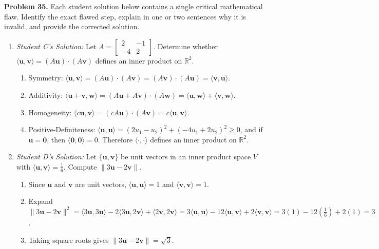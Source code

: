 \documentclass[11pt, letterpaper]{article}
\theoremstyle{definition}
\theoremstyle{remark}
\begin{document}
\textbf{Problem 35.} Each student solution below contains a single critical mathematical flaw. Identify the exact flawed step, explain in one or two sentences why it is invalid, and provide the corrected solution.
\begin{enumerate}[label=(\alph*)]
    \item \emph{Student C's Solution:} Let $A = \begin{bmatrix} 2 & -1 \\ -4 & 2 \end{bmatrix}$. Determine whether $\langle \mathbf{u}, \mathbf{v} \rangle = (A\mathbf{u}) \cdot (A\mathbf{v})$ defines an inner product on $\mathbb{R}^2$.
    \begin{enumerate}[label=Step \arabic*:]
        \item Symmetry: $\langle \mathbf{u}, \mathbf{v} \rangle = (A\mathbf{u})\cdot(A\mathbf{v}) = (A\mathbf{v})\cdot(A\mathbf{u}) = \langle \mathbf{v}, \mathbf{u} \rangle$.
        \item Additivity: $\langle \mathbf{u}+\mathbf{v}, \mathbf{w} \rangle = (A\mathbf{u}+A\mathbf{v})\cdot(A\mathbf{w}) = \langle \mathbf{u}, \mathbf{w} \rangle + \langle \mathbf{v}, \mathbf{w} \rangle$.
        \item Homogeneity: $\langle c\mathbf{u}, \mathbf{v} \rangle = (cA\mathbf{u})\cdot(A\mathbf{v}) = c\langle \mathbf{u}, \mathbf{v} \rangle$.
        \item Positive-Definiteness: $\langle \mathbf{u}, \mathbf{u} \rangle = (2u_1 - u_2)^2 + (-4u_1 + 2u_2)^2 \ge 0$, and if $\mathbf{u} = \mathbf{0}$, then $\langle \mathbf{0}, \mathbf{0} \rangle = 0$. Therefore $\langle \cdot, \cdot \rangle$ defines an inner product on $\mathbb{R}^2$.
    \end{enumerate}
    \item \emph{Student D's Solution:} Let $\{\mathbf{u}, \mathbf{v}\}$ be unit vectors in an inner product space $V$ with $\langle \mathbf{u}, \mathbf{v} \rangle = \frac{1}{6}$. Compute $\|3\mathbf{u} - 2\mathbf{v}\|$.
    \begin{enumerate}[label=Step \arabic*:]
        \item Since $\mathbf{u}$ and $\mathbf{v}$ are unit vectors, $\langle \mathbf{u}, \mathbf{u} \rangle = 1$ and $\langle \mathbf{v}, \mathbf{v} \rangle = 1$.
        \item Expand $\|3\mathbf{u} - 2\mathbf{v}\|^2 = \langle 3\mathbf{u}, 3\mathbf{u} \rangle - 2\langle 3\mathbf{u}, 2\mathbf{v} \rangle + \langle 2\mathbf{v}, 2\mathbf{v} \rangle = 3\langle \mathbf{u}, \mathbf{u} \rangle - 12\langle \mathbf{u}, \mathbf{v} \rangle + 2\langle \mathbf{v}, \mathbf{v} \rangle = 3(1) - 12\left(\frac{1}{6}\right) + 2(1) = 3$.
        \item Taking square roots gives $\|3\mathbf{u} - 2\mathbf{v}\| = \sqrt{3}$.
    \end{enumerate}
\end{enumerate}
\end{document}
